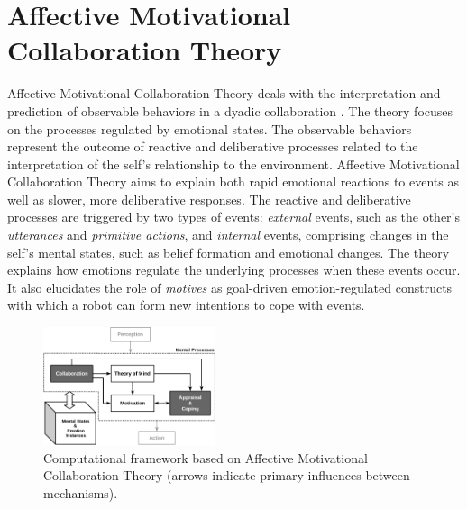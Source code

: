 \documentclass{article}
\begin{document}
\section{{\fontsize{11.85}{12}\selectfont Affective Motivational Collaboration
Theory}}

Affective Motivational Collaboration Theory deals with the interpretation and
prediction of observable behaviors in a dyadic collaboration
\cite{shayganfar:appraisal-short}. The theory focuses on the processes regulated
by emotional states. The observable behaviors represent the outcome of reactive
and deliberative processes related to the interpretation of the self's
relationship to the environment. Affective Motivational Collaboration Theory
aims to explain both rapid emotional reactions to events as well as slower, more
deliberative responses. The reactive and deliberative processes are triggered by
two types of events: \textit{external} events, such as the other's
\textit{utterances} and \textit{primitive actions}, and \textit{internal}
events, comprising changes in the self's mental states, such as belief formation
and emotional changes. The theory explains how emotions regulate the underlying
processes when these events occur. It also elucidates the role of
\textit{motives} as goal-driven emotion-regulated constructs with which a robot
can form new intentions to cope with events.

\vspace*{-3mm}
\begin{figure}[tbh]
  \centering
  \includegraphics[width=0.45\textwidth]{figure/theory-general-croped.pdf}
  \vspace*{-3mm}
  \caption{{\fontsize{9}{9}\selectfont Computational framework based on
  Affective Motivational Collaboration Theory (arrows indicate primary
  influences between mechanisms).}}
  \vspace*{-3mm}
  \label{fig:cpm}
\end{figure}
\end{document}
